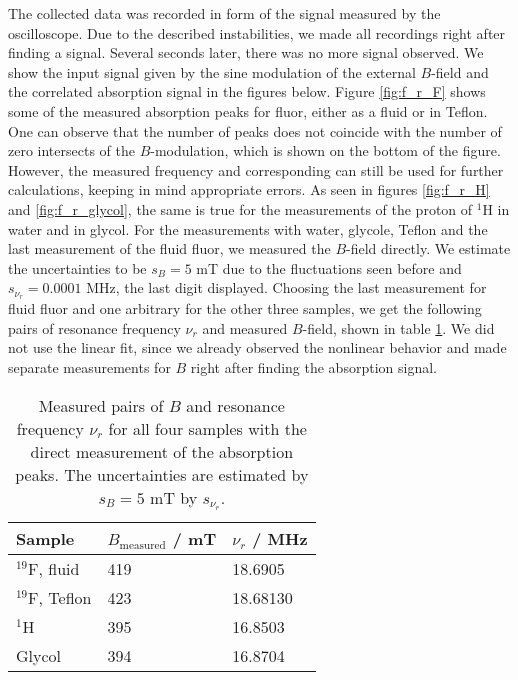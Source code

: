 The collected data was recorded in form of the signal measured by the oscilloscope. 
Due to the described instabilities, we made all recordings right after finding a signal. 
Several seconds later, there was no more signal observed.
We show the input signal given by the sine modulation of the external $B$-field and 
the correlated absorption signal in the figures below. Figure \ref{fig:f_r_F} shows 
some of the measured absorption peaks for fluor, either as a fluid or in Teflon. 
One can observe that the number of peaks does not coincide with the number of zero 
intersects of the $B$-modulation, which is shown on the bottom of the figure. 
However, the measured frequency and corresponding can still be used for further calculations, 
keeping in mind appropriate errors. 
As seen in figures \ref{fig:f_r_H} and \ref{fig:f_r_glycol}, the same is true for 
the measurements of the proton of $^1$H in water and in glycol. For the measurements with 
water, glycole, Teflon and the last measurement of the fluid fluor, we measured the $B$-field 
directly. We estimate the uncertainties to be $s_B = 5$ mT due to the fluctuations seen before and 
$s_{\nu_r} = 0.0001$ MHz, the last digit displayed. 
Choosing the last measurement for fluid fluor and one arbitrary for the other three samples, we get the 
following pairs of resonance frequency $\nu_r$ and measured 
$B$-field, shown in table \ref{tab:f_r}. 
We did not use the linear fit, since we already observed the nonlinear behavior and 
made separate measurements for $B$ right after finding the absorption signal. 
\renewcommand{\arraystretch}{1.5}
\begin{table}[htdp]
\centering
\begin{tabular}{|p{6.18cm}|p{3.82cm}|p{3.82cm}|}
        \hline
        \rowcolor{LightCyan}
        Sample & $B_\mathrm{measured}$ / mT & $\nu_r$ / MHz\\ \hline
        $^{19}$F, fluid & 419 & 18.6905\\
        $^{19}$F, Teflon & 423 & 18.68130\\
        $^1$H   & 395 & 16.8503 \\
        Glycol  & 394 & 16.8704 \\
        \hline
    \end{tabular}
    \caption{
        Measured pairs of $B$ and resonance frequency $\nu_r$ for all four samples with the direct measurement 
        of the absorption peaks. The uncertainties are estimated by $s_B = 5$ mT by $s_{\nu_r}$. 
        }
    \label{tab:f_r}
\end{table}

\FloatBarrier

